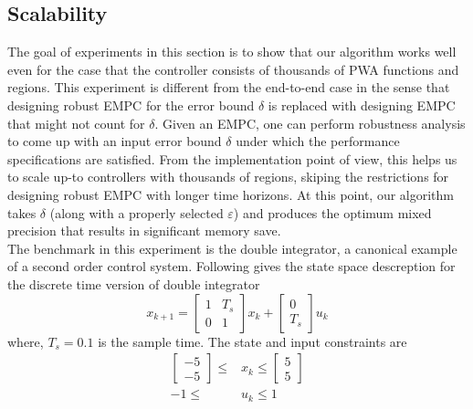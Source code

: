 \subsection{Scalability}
The goal of experiments in this section is to show that our algorithm works well even for the case that the controller consists of thousands of PWA functions and regions. 
This experiment is different from the end-to-end case in the sense that designing robust EMPC for the error bound $\delta$ is replaced with designing EMPC that might not count for $\delta$. Given an EMPC, one can perform robustness analysis to come up with an input error bound $\delta$ under which the performance specifications are satisfied. From the implementation point of view, this helps us to scale up-to controllers with thousands of regions, skiping the restrictions for designing robust EMPC with longer time horizons. At this point, our algorithm takes $\delta$ (along with a properly selected $\varepsilon$) and produces the optimum mixed precision that results in significant memory save.\\
The benchmark in this experiment is the double integrator, a canonical example
of a second order control system. Following gives the state space descreption for the discrete time version of double integrator
\begin{equation}
x_{k+1}=
\begin{bmatrix}
1 & T_s\\
0& 1	
\end{bmatrix}
x_k+
\begin{bmatrix}
0\\
T_s
\end{bmatrix}u_k
\label{eq:int2_ss}
\end{equation}
where, $T_s=0.1$ is the sample time. The state and input constraints are
\begin{align*}
	\begin{bmatrix}
		-5\\-5
	\end{bmatrix}\leq&
	x_k\leq
	\begin{bmatrix}
	5\\5
	\end{bmatrix}\\
	-1\leq& u_k \leq 1
\end{align*}%

